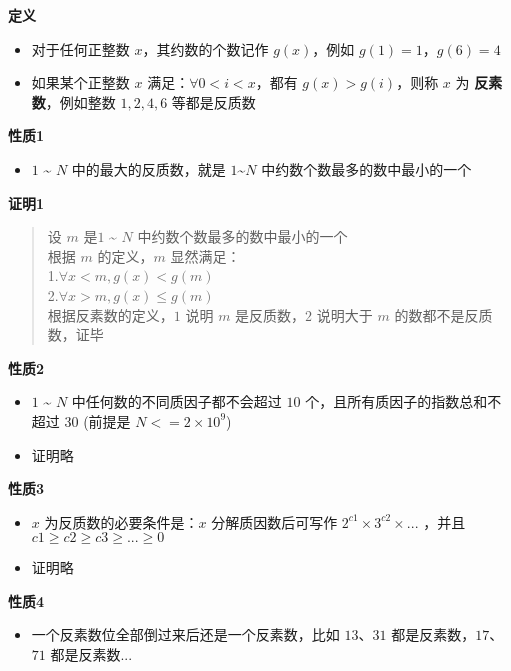 \documentclass[E:/GsjzTle/main/main.tex]{subfiles}
\begin{document}
\textbf{定义}

\begin{itemize}
\item
  对于任何正整数 \(x\)，其约数的个数记作 \(g(x)\)，例如
  \(g(1)=1\)，\(g(6)=4\)
\item
  如果某个正整数 \(x\) 满足：\(\forall 0 < i < x\)，都有
  \(g(x) > g(i)\)，则称 \(x\) 为 \textbf{反素数}，例如整数 \(1,2,4,6\)
  等都是反质数
\end{itemize}

\textbf{性质1}

\begin{itemize}
\item
  \(1\) \textasciitilde{} \(N\) 中的最大的反质数，就是
  \(1\)\textasciitilde{}\(N\) 中约数个数最多的数中最小的一个
\end{itemize}

\textbf{证明1}

\begin{quote}
设 \(m\) 是\(1\) \textasciitilde{} \(N\)
中约数个数最多的数中最小的一个\\
根据 \(m\) 的定义，\(m\) 显然满足：\\
1.\({\forall}x < m, g(x) < g(m)\)\\
2.\({\forall} x > m , g(x) ≤ g(m)\)\\
根据反素数的定义，\(1\) 说明 \(m\) 是反质数，\(2\) 说明大于 \(m\)
的数都不是反质数，证毕
\end{quote}

\textbf{性质2}

\begin{itemize}
\item
  \(1\) \textasciitilde{} \(N\) 中任何数的不同质因子都不会超过 \(10\)
  个，且所有质因子的指数总和不超过 \(30\) (前提是 \(N <= 2\times10^9\))
\item
  证明略
\end{itemize}

\textbf{性质3}

\begin{itemize}
\item
  \(x\) 为反质数的必要条件是：\(x\) 分解质因数后可写作
  \(2^{c1}\times3^{c2}\times...\) ，并且 \(c1≥c2≥c3≥...≥0\)
\item
  证明略
\end{itemize}

\textbf{性质4}

\begin{itemize}
	\item
	一个反素数位全部倒过来后还是一个反素数，比如 \(13\)、\(31\) 都是反素数，\(17\)、\(71\) 都是反素数... 
\end{itemize}
\end{document}
